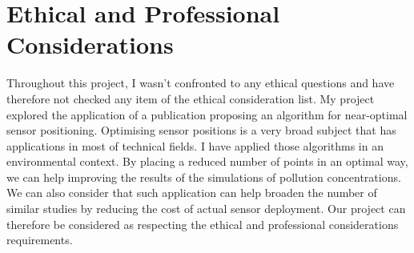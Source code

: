 \chapter{Ethical and Professional Considerations}


Throughout this project, I wasn't confronted to any ethical questions and have therefore not checked any item of the ethical consideration list. My project explored the application of a publication proposing an algorithm for near-optimal sensor positioning. Optimising sensor positions is a very broad subject that has applications in most of technical fields. I have applied those algorithms in an environmental context. By placing a reduced number of points in an optimal way, we can help improving the results of the simulations of pollution concentrations. We can also consider that such application can help broaden the number of similar studies by reducing the cost of actual sensor deployment. Our project can therefore be considered as respecting the ethical and professional considerations requirements. 

  
